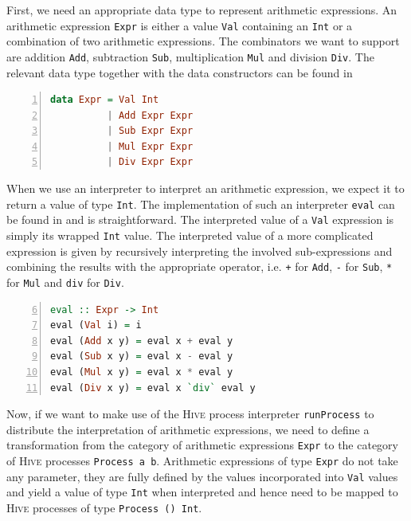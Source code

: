 First, we need an appropriate data type to represent arithmetic expressions. An arithmetic expression \texttt{Expr} is either a value \texttt{Val} containing an \texttt{Int} or a combination of two arithmetic expressions. The combinators we want to support are addition \texttt{Add}, subtraction \texttt{Sub}, multiplication \texttt{Mul} and division \texttt{Div}. The relevant data type together with the data constructors can be found in  
\begin{lstlisting}[language=Haskell, caption=Data model for the representation of arithmetic expressions., label=lst:arith_model, numbers=left, frame=bt]
data Expr = Val Int
          | Add Expr Expr
          | Sub Expr Expr
          | Mul Expr Expr
          | Div Expr Expr
\end{lstlisting}

When we use an interpreter to interpret an arithmetic expression, we expect it to return a value of type \texttt{Int}. The implementation of such an interpreter \texttt{eval} can be found in  and is straightforward. The interpreted value of a \texttt{Val} expression is simply its wrapped \texttt{Int} value. The interpreted value of a more complicated expression is given by recursively interpreting the involved sub-expressions and combining the results with the appropriate operator, i.e. \texttt{+} for \texttt{Add}, \texttt{-} for \texttt{Sub}, \texttt{*} for \texttt{Mul} and \texttt{div} for \texttt{Div}.
\begin{lstlisting}[language=Haskell, caption=Implementation of an interpreter for arithmetic expressions of type \texttt{Expr}., label=lst:arith_eval, numbers=left, frame=bt, firstnumber=6]
eval :: Expr -> Int
eval (Val i) = i
eval (Add x y) = eval x + eval y
eval (Sub x y) = eval x - eval y
eval (Mul x y) = eval x * eval y
eval (Div x y) = eval x `div` eval y
\end{lstlisting}

Now, if we want to make use of the \textsc{Hive} process interpreter \texttt{runProcess} to distribute the interpretation of arithmetic expressions, we need to define a transformation from the category of arithmetic expressions \texttt{Expr} to the category of \textsc{Hive} processes \texttt{Process a b}. Arithmetic expressions of type \texttt{Expr} do not take any parameter, they are fully defined by the values incorporated into \texttt{Val} values and yield a value of type \texttt{Int} when interpreted and hence need to be mapped to \textsc{Hive} processes of type \texttt{Process () Int}.

